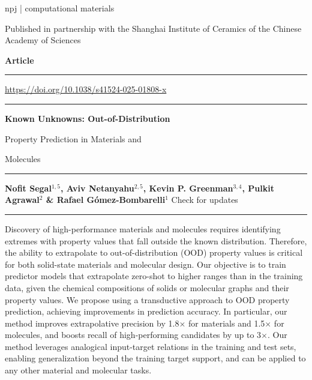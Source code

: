 \documentclass[10pt]{article}
\newcommand{\topheader}{%
\noindent\begin{minipage}[t]{0.62\textwidth}
{\fontsize{18}{20}\selectfont \textcolor{npjred}{npj} | computational materials}

{\fontsize{7.5}{9}\selectfont Published in partnership with the Shanghai Institute of Ceramics of the Chinese Academy of Sciences}
\end{minipage}%
\begin{minipage}[t]{0.38\textwidth}
\raggedleft
{\bfseries\fontsize{16}{18}\selectfont Article}
\end{minipage}

\vspace{2pt}
{\color{npjred}\rule{\textwidth}{1.2pt}}
}
\begin{document}
\color{black}
\topheader

\vspace{36pt}
\noindent\hfill{\fontsize{10}{12}\selectfont \textcolor{npjblue}{\href{https://doi.org/10.1038/s41524-025-01808-x}{https://doi.org/10.1038/s41524-025-01808-x}}}

{\color{lightgrayrule}\rule{\textwidth}{0.5pt}}

\vspace{10pt}
{\bfseries\fontsize{34}{36}\selectfont Known Unknowns: Out-of-Distribution\par Property Prediction in Materials and\par Molecules\par}

\vspace{22pt}
{\color{lightgrayrule}\rule{\textwidth}{0.5pt}}

\vspace{6pt}
{\bfseries\fontsize{12}{14}\selectfont Nofit Segal$^{1,5}$, Aviv Netanyahu$^{2,5}$, Kevin P. Greenman$^{3,4}$, Pulkit Agrawal$^{2}$ \& Rafael G\'omez-Bombarelli$^{1}$}
\hfill {\fontsize{9}{11}\selectfont Check for updates}

\vspace{8pt}
{\color{lightgrayrule}\rule{\textwidth}{0.5pt}}

\vspace{8pt}
{\fontsize{15}{21}\selectfont Discovery of high-performance materials and molecules requires identifying extremes with property values that fall outside the known distribution. Therefore, the ability to extrapolate to out-of-distribution (OOD) property values is critical for both solid-state materials and molecular design. Our objective is to train predictor models that extrapolate zero-shot to higher ranges than in the training data, given the chemical compositions of solids or molecular graphs and their property values. We propose using a transductive approach to OOD property prediction, achieving improvements in prediction accuracy. In particular, our method improves extrapolative precision by 1.8$\times$ for materials and 1.5$\times$ for molecules, and boosts recall of high-performing candidates by up to 3$\times$. Our method leverages analogical input-target relations in the training and test sets, enabling generalization beyond the training target support, and can be applied to any other material and molecular tasks.\par}
\end{document}
